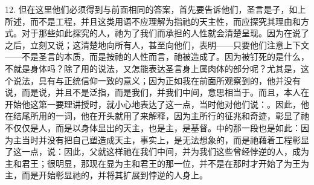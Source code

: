 12. 但在这里他们必须得到与前面相同的答案，首先要告诉他们，圣言是子，如上所述，而不是工程，并且这类用语不应理解为指祂的天主性，而应探究其理由和方式。对于那些如此探究的人，祂为了我们而承担的人性就会清楚呈现。因为在说了之后，立刻又说；这清楚地向所有人，甚至向他们，表明——只要他们注意上下文——不是圣言的本质，而是按祂的人性而言，祂被造成了。因为被钉死的是什么，不就是身体吗？除了用的说法，又怎能表达圣言身上属肉体的部分呢？尤其是，这个说法，具有与正统信仰一致的意义；因为正如我在前面所观察到的，他并没有说，而是说，并且不是泛指，而是我们，并我们中间，意思相当于。而且，本人在开始他这第一要理讲授时，就小心地表达了这一点，当时他对他们说：。因此，他在结尾所用的一词，他在开头就用了来解释，因为主所行的征兆和奇迹，彰显了祂不仅仅是人，而是以身体显出的天主，也是主，是基督。中的那一段也是如此：因为主当时并没有把自己塑造成天主，事实上，是无法想象的，而是祂藉着工程彰显了这一点，说：因此，父就这样祂在我们中间，并为我们这些曾经悖逆的人，成为主和君王；很明显，那现在显为主和君王的那一位，并不是在那时才开始了为王为主，而是开始彰显祂的，并将其扩展到悖逆的人身上。\par

